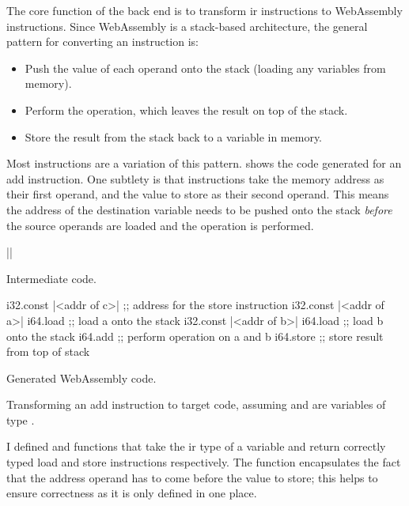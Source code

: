 \documentclass[00-main.tex]{subfiles}
\begin{document}
The core function of the back end is to transform \gls{ir} instructions to WebAssembly instructions.
Since WebAssembly is a stack-based architecture, the general pattern for converting an instruction is:
\begin{itemize}[nosep]
\item Push the value of each operand onto the stack (loading any variables from memory).
\item Perform the operation, which leaves the result on top of the stack.
\item Store the result from the stack back to a variable in memory.
\end{itemize}
Most instructions are a variation of this pattern.
 shows the code generated for an add instruction.
One subtlety is that  instructions take the memory address as their first operand, and the value to store as their second operand.
This means the address of the destination variable needs to be pushed onto the stack \emph{before} the source operands are loaded and the operation is performed.

\begin{listing}[t]
  \begin{sublisting}[b]{0.28\textwidth}
    \begin{TextListing}
      ||
    \end{TextListing}
    \caption{Intermediate code.}
  \end{sublisting}
  \hfill
  \begin{sublisting}[b]{0.7\textwidth}
    \begin{WasmListing}
      i32.const |<addr of c>|  ;; address for the store instruction
      i32.const |<addr of a>|
      i64.load               ;; load a onto the stack
      i32.const |<addr of b>|
      i64.load               ;; load b onto the stack
      i64.add                ;; perform operation on a and b
      i64.store              ;; store result from top of stack
    \end{WasmListing}
    \caption{Generated WebAssembly code.}
  \end{sublisting}
  \caption{Transforming an add instruction to target code, assuming  and  are variables of type .}
  \label{lst:converting add instr to wasm code}
\end{listing}

I defined  and  functions that take the \gls{ir} type of a variable and return correctly typed load and store instructions respectively.
The  function encapsulates the fact that the address operand has to come before the value to store; this helps to ensure correctness as it is only defined in one place.
\end{document}
